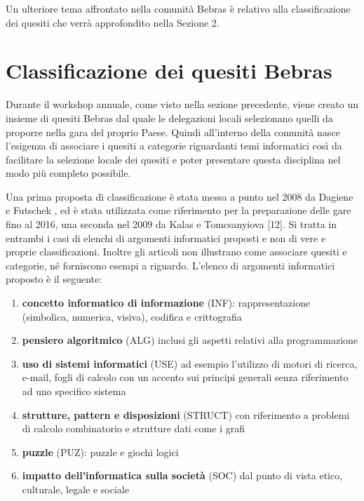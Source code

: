 \documentclass[12pt]{report}
\begin{document}
Un ulteriore tema affrontato nella comunità Bebras è relativo alla classificazione dei quesiti che verrà approfondito nella Sezione 2.

%
%
%	
\section{Classificazione dei quesiti Bebras}\label{Classificazione}
Durante il workshop annuale, come visto nella sezione precedente, viene creato un insieme di quesiti Bebras dal quale le delegazioni locali selezionano quelli da proporre nella gara del proprio Paese. Quindi all'interno della comunità nasce l'esigenza di associare i quesiti a categorie riguardanti temi informatici così da facilitare la selezione locale dei quesiti e poter presentare questa disciplina nel modo più completo possibile.

Una prima proposta di classificazione è stata messa a punto nel 2008 da Dagiene e Futschek \cite{DagieneISEEP2008}, ed è stata utilizzata come riferimento per la preparazione delle gare fino al 2016, una seconda nel 2009 da Kalas e Tomcsanyiova [12]. Si tratta in entrambi i casi di elenchi di argomenti informatici proposti e non di vere e proprie classificazioni. Inoltre gli articoli non illustrano come associare quesiti e categorie, né forniscono esempi a riguardo.
L'elenco di argomenti informatici proposto è il seguente:

\begin{enumerate}
	\item \textbf{concetto informatico di informazione} (INF): rappresentazione (simbolica, numerica, visiva), codifica e crittografia
	
	\item \textbf{pensiero algoritmico} (ALG) inclusi gli aspetti relativi alla programmazione
	
	\item \textbf{uso di sistemi informatici} (USE) ad esempio l'utilizzo di motori di ricerca, e-mail, fogli di calcolo con un accento sui principi generali senza riferimento ad uno specifico sistema
	
	\item \textbf{strutture, pattern e disposizioni} (STRUCT) con riferimento a problemi di calcolo combinatorio e strutture dati come i grafi
	
	\item \textbf{puzzle} (PUZ): puzzle e giochi logici
	
	\item \textbf{impatto dell'informatica sulla società} (SOC) dal punto di vista etico, culturale, legale e sociale
\end{enumerate}
\end{document}
